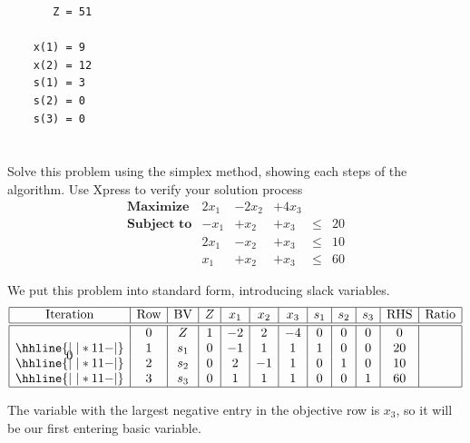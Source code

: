 \documentclass[12pt]{article}
\newenvironment{problem}
    {\begin{lrbox}{\mybox}\begin{minipage}{0.98\textwidth}}
    {\end{minipage}\end{lrbox}\begin{center}\framebox[\textwidth]{\usebox{\mybox}}\end{center}}
\theoremstyle{definition}
\begin{document}
\lstset{basicstyle=\ttfamily}
\begin{lstlisting}
       Z = 51
    
    x(1) = 9
    x(2) = 12
    s(1) = 3
    s(2) = 0
    s(3) = 0
\end{lstlisting}


\newpage
\section{}
\begin{problem}
    Solve this problem using the simplex method, showing each steps of the algorithm. Use Xpress to verify your solution process
    \[\begin{array}{lrrrcr}
        \textbf{Maximize}   & 2x_1  & -2x_2 & +4x_3 \\
        \textbf{Subject to} & -x_1  & +x_2  & +x_3 &\leq& 20 \\
                            & 2x_1  & -x_2  & +x_3 &\leq& 10 \\
                            & x_1   & +x_2  & +x_3 &\leq& 60
    \end{array}\]
\end{problem}

We put this problem into standard form, introducing slack variables.
\[\begin{array}{*{12}{|c}|}
    \hline
    \text{Iteration} & \text{Row} & \text{BV} & Z & x_1 & x_2 & x_3 & s_1 & s_2 & s_3 & \text{RHS} & \text{Ratio} \\\hline\hline
    \multirow{4}*{0}
    & 0 & Z   & 1 & -2 & 2  & -4 & 0 & 0 & 0 & 0  & \\\hhline{|~|*{11}{-}|}
    & 1 & s_1 & 0 & -1 & 1  & 1  & 1 & 0 & 0 & 20 & \\\hhline{|~|*{11}{-}|}
    & 2 & s_2 & 0 & 2  & -1 & 1  & 0 & 1 & 0 & 10 & \\\hhline{|~|*{11}{-}|}
    & 3 & s_3 & 0 & 1  & 1  & 1  & 0 & 0 & 1 & 60 & \\\hline
\end{array}\]

The variable with the largest negative entry in the objective row is $x_3$, so it will be our first entering basic variable.
\end{document}
